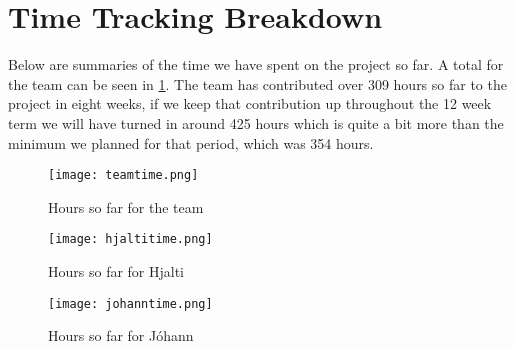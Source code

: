 \section{Time Tracking Breakdown }\label{sec:time}

Below are summaries of the time we have spent on the project so far. A total for the team can be seen in \ref{fig:team}. The team has contributed over 309 hours so far to the project in eight weeks, if we keep that contribution up throughout the 12 week term we will have turned in around 425 hours which is quite a bit more than the minimum we planned for that period, which was 354 hours. 

\begin{figure}[H]
	\centering
	\graphicspath{ {./graphics/} }
    \centerline{\texttt{[image: teamtime.png]}}
    \caption{\label{fig:team}Hours so far for the team}
\end{figure}

\begin{figure}[H]
	\centering
	\graphicspath{ {./graphics/} }
    \centerline{\texttt{[image: hjaltitime.png]}}
    \caption{\label{fig:hjalti}Hours so far for Hjalti}
\end{figure}

\begin{figure}[H]
	\centering
	\graphicspath{ {./graphics/} }
    \centerline{\texttt{[image: johanntime.png]}}
    \caption{\label{fig:johann}Hours so far for Jóhann}
\end{figure}

